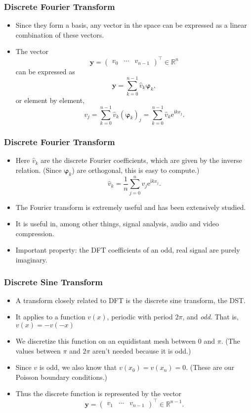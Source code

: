 \begin{frame}
  \frametitle{Discrete Fourier Transform}
  \begin{itemize}
  \item Since they form a basis, any vector in the space can be expressed as a
    linear combination of these vectors.
  \item The vector
    \[
      \bm y = \begin{pmatrix} v_0 & \cdots & v_{n-1} \end{pmatrix}^\intercal \in
      \mathbb{R}^n
    \]
    can be expressed as
    \[
      \bm y = \sum_{k=0}^{n-1} \hat{v}_k \bm \varphi_k,
    \]
    or element by element,
    \[
      v_j = \sum_{k=0}^{n-1} \hat{v}_k (\bm \varphi_k)_j
      = \sum_{k=0}^{n-1} \hat{v}_k \text{e}^{\text{i}kx_j}.
    \]
  \end{itemize}
\end{frame}

\begin{frame}
  \frametitle{Discrete Fourier Transform}
  \begin{itemize}
  \item Here $\hat{v}_k$ are the discrete Fourier coefficients, which are given
    by the inverse relation. (Since $\bm \varphi_k$) are orthogonal, this is
    easy to compute.)
    \[
      \hat{v}_k = \frac{1}{n} \sum_{j=0}^n v_j \text{e}^{\text{i}kx_j}.
    \]
  \item The Fourier transform is extremely useful and has been extensively
    studied.
  \item It is useful in, among other things, signal analysis, audio and video
    compression.
  \item Important property: the DFT coefficients of an odd, real signal are
    purely imaginary.
  \end{itemize}
\end{frame}

\begin{frame}
  \frametitle{Discrete Sine Transform}
  \begin{itemize}
  \item A transform closely related to DFT is the discrete sine transform, the
    DST.
  \item It applies to a function $v(x)$, periodic with period $2\pi$, and
    \emph{odd}. That is, $v(x) = -v(-x)$
  \item We discretize this function on an equidistant mesh between 0 and $\pi$.
    (The values between $\pi$ and $2\pi$ aren't needed because it is odd.)
  \item Since $v$ is odd, we also know that $v(x_0) = v(x_n) = 0$. (These are
    our Poisson boundary conditions.)
  \item Thus the discrete function is represented by the vector
    \[
      \bm y = \begin{pmatrix} v_1 & \cdots & v_{n-1} \end{pmatrix}^\intercal
      \in \mathbb{R}^{n-1}.
    \]
  \end{itemize}
\end{frame}

